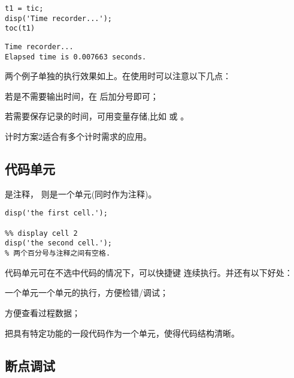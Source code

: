 \vspace{-0.8cm}
\begin{lstlisting}[caption=计时2]
t1 = tic;
disp('Time recorder...');
toc(t1)
\end{lstlisting}

\vspace{-0.8cm}
\begin{lstlisting}
Time recorder...
Elapsed time is 0.007663 seconds.
\end{lstlisting}

两个例子单独的执行效果如上。在使用时可以注意以下几点：

\begindot
  \item 若是不需要输出时间，在  后加分号即可；
  \item 若需要保存记录的时间，可用变量存储,比如  或 。
  \item 计时方案2适合有多个计时需求的应用。
\myenddot






\subsection{代码单元}

\mcode{\%} 是注释，\mcode{\%\%} 则是一个单元(同时作为注释)。

\vspace{-0.8cm}
\begin{lstlisting}[caption=代码单元]
%% display cell 1
disp('the first cell.');

%% display cell 2
disp('the second cell.');
% 两个百分号与注释之间有空格.
\end{lstlisting}

代码单元可在不选中代码的情况下，可以快捷键  连续执行。并还有以下好处：

\begindot
  \item 一个单元一个单元的执行，方便检错/调试；
  \item 方便查看过程数据；
  \item 把具有特定功能的一段代码作为一个单元，使得代码结构清晰。
\myenddot





\subsection{断点调试}

